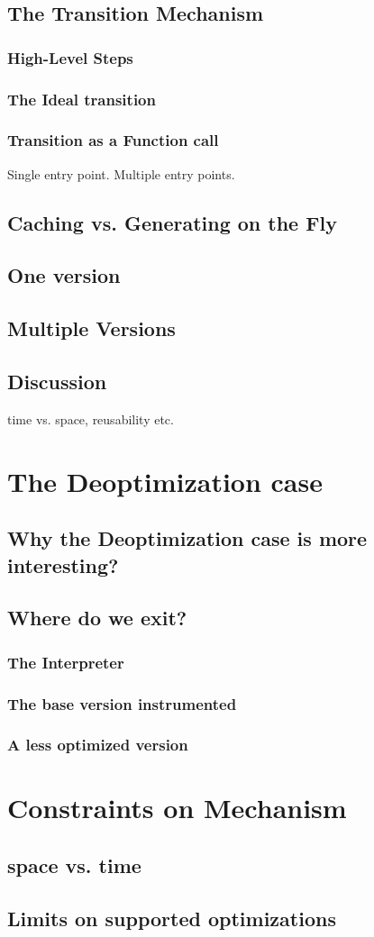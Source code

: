 \subsection{The Transition Mechanism}
\subsubsection{High-Level Steps}
\subsubsection{The Ideal transition}
\subsubsection{Transition as a Function call}
Single entry point.
Multiple entry points.

\subsection{Caching vs. Generating on the Fly}
\subsection{One version}
\subsection{Multiple Versions}
\subsection{Discussion}
time vs. space, reusability etc.

\section{The Deoptimization case}

\subsection{Why the Deoptimization case is more interesting?}

\subsection{Where do we exit?}
\subsubsection{The Interpreter}
\subsubsection{The base version instrumented}
\subsubsection{A less optimized version}

\section{Constraints on Mechanism}
\subsection{space vs. time}
\subsection{Limits on supported optimizations}



